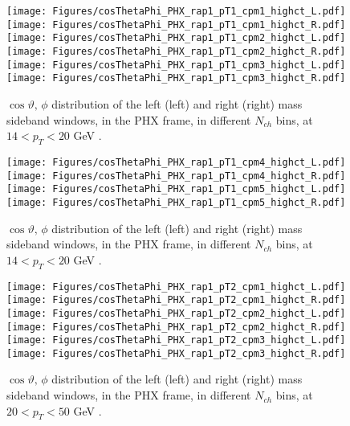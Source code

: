 \documentclass[12pt]{article}
\begin{document}
\begin{figure}[htbp]
\centering
\texttt{[image: Figures/cosThetaPhi\_PHX\_rap1\_pT1\_cpm1\_highct\_L.pdf]}
\texttt{[image: Figures/cosThetaPhi\_PHX\_rap1\_pT1\_cpm1\_highct\_R.pdf]}
\texttt{[image: Figures/cosThetaPhi\_PHX\_rap1\_pT1\_cpm2\_highct\_L.pdf]}
\texttt{[image: Figures/cosThetaPhi\_PHX\_rap1\_pT1\_cpm2\_highct\_R.pdf]}
\texttt{[image: Figures/cosThetaPhi\_PHX\_rap1\_pT1\_cpm3\_highct\_L.pdf]}
\texttt{[image: Figures/cosThetaPhi\_PHX\_rap1\_pT1\_cpm3\_highct\_R.pdf]}
\caption{$\cos\vartheta,\,\phi$ distribution of the left (left) and
  right (right) mass sideband windows, in the PHX frame, in different
  $N_{ch}$ bins, at $14 < p_{T} < 20$ GeV .}
\end{figure}
\clearpage

\begin{figure}[htbp]
\centering
\texttt{[image: Figures/cosThetaPhi\_PHX\_rap1\_pT1\_cpm4\_highct\_L.pdf]}
\texttt{[image: Figures/cosThetaPhi\_PHX\_rap1\_pT1\_cpm4\_highct\_R.pdf]}
\texttt{[image: Figures/cosThetaPhi\_PHX\_rap1\_pT1\_cpm5\_highct\_L.pdf]}
\texttt{[image: Figures/cosThetaPhi\_PHX\_rap1\_pT1\_cpm5\_highct\_R.pdf]}
\caption{$\cos\vartheta,\,\phi$ distribution of the left (left) and
  right (right) mass sideband windows, in the PHX frame, in different
  $N_{ch}$ bins, at $14 < p_{T} < 20$ GeV .}
\end{figure}
\clearpage


\begin{figure}[htbp]
\centering
\texttt{[image: Figures/cosThetaPhi\_PHX\_rap1\_pT2\_cpm1\_highct\_L.pdf]}
\texttt{[image: Figures/cosThetaPhi\_PHX\_rap1\_pT2\_cpm1\_highct\_R.pdf]}
\texttt{[image: Figures/cosThetaPhi\_PHX\_rap1\_pT2\_cpm2\_highct\_L.pdf]}
\texttt{[image: Figures/cosThetaPhi\_PHX\_rap1\_pT2\_cpm2\_highct\_R.pdf]}
\texttt{[image: Figures/cosThetaPhi\_PHX\_rap1\_pT2\_cpm3\_highct\_L.pdf]}
\texttt{[image: Figures/cosThetaPhi\_PHX\_rap1\_pT2\_cpm3\_highct\_R.pdf]}
\caption{$\cos\vartheta,\,\phi$ distribution of the left (left) and
  right (right) mass sideband windows, in the PHX frame, in different
  $N_{ch}$ bins, at $20 < p_{T} < 50$ GeV .}
\end{figure}
\clearpage
\end{document}
